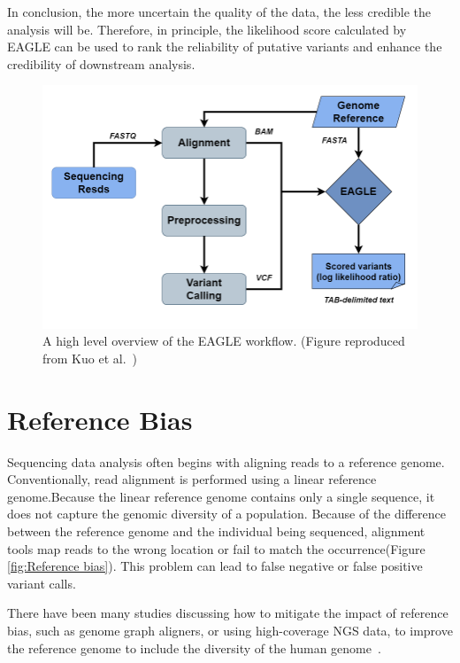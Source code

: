 \documentclass[PhD]{PHlab-thesis}
\begin{document}
In conclusion, the more uncertain the quality of the data, the less credible the analysis will be. Therefore, in principle, the likelihood score calculated by EAGLE can be used to rank the reliability of putative variants and enhance the credibility of downstream analysis.

\begin{figure}[h!]
	\centering
	\includegraphics[scale=0.3]{figures/EAGLE.png}
	\caption{A high level overview of the EAGLE workflow. (Figure reproduced from Kuo et al.~\cite{Kuo2018EAGLE})}
	\label{fig:EAGLE workflow} %
\end{figure}

\section{Reference Bias}
Sequencing data analysis often begins with aligning reads to a reference genome. Conventionally, read alignment is performed using a linear reference genome.Because the linear reference genome contains only a single sequence, it does not capture the genomic diversity of a population. Because of the difference between the reference genome and the individual being sequenced, alignment tools map reads to the wrong location or fail to match the occurrence(Figure \ref{fig:Reference bias}). This problem can lead to false negative or false positive variant calls.

There have been many studies discussing how to mitigate the impact of reference bias, such as genome graph aligners, or using high-coverage NGS data, to improve the reference genome to include the diversity of the human genome~\cite{Günther2019Refbias, Chen2021Refbias}.
\end{document}
